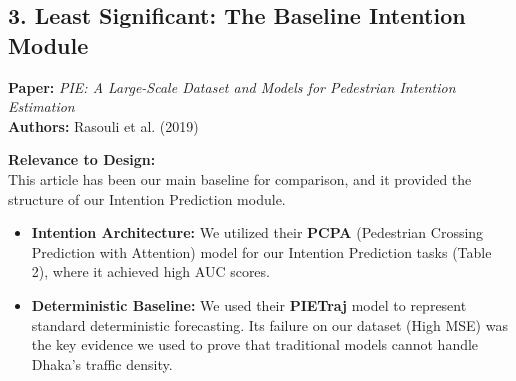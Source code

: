 \documentclass[12pt, a4paper]{article}
\begin{document}
\subsection*{3. Least Significant: The Baseline Intention Module}
\textbf{Paper:} \textit{PIE: A Large-Scale Dataset and Models for Pedestrian Intention Estimation} \\
\textbf{Authors:} Rasouli et al. (2019)

\noindent\textbf{Relevance to Design:} \\
This article has been our main baseline for comparison, and it provided the structure of our Intention Prediction module.
\begin{itemize}
    \item \textbf{Intention Architecture:} We utilized their \textbf{PCPA} (Pedestrian Crossing Prediction with Attention) model for our Intention Prediction tasks (Table 2), where it achieved high AUC scores.
    \item \textbf{Deterministic Baseline:} We used their \textbf{PIETraj} model to represent standard deterministic forecasting. Its failure on our dataset (High MSE) was the key evidence we used to prove that traditional models cannot handle Dhaka’s traffic density.
\end{itemize}
\end{document}

